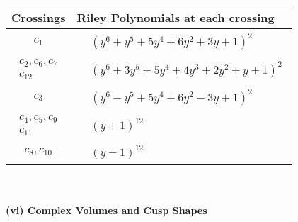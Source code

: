 \documentclass[1p]{elsarticle_modified}
\theoremstyle{definition}
\begin{document}
\begin{tabular}{m{50pt}|m{274pt}}
Crossings & \hspace{64pt}Riley Polynomials at each crossing \\
\hline $$\begin{aligned}c_{1}\end{aligned}$$&$\begin{aligned}
&(y^6+y^5+5 y^4+6 y^2+3 y+1)^2
\end{aligned}$\\
\hline $$\begin{aligned}c_{2},c_{6},c_{7}\\c_{12}\end{aligned}$$&$\begin{aligned}
&(y^6+3 y^5+5 y^4+4 y^3+2 y^2+y+1)^2
\end{aligned}$\\
\hline $$\begin{aligned}c_{3}\end{aligned}$$&$\begin{aligned}
&(y^6- y^5+5 y^4+6 y^2-3 y+1)^2
\end{aligned}$\\
\hline $$\begin{aligned}c_{4},c_{5},c_{9}\\c_{11}\end{aligned}$$&$\begin{aligned}
&(y+1)^{12}
\end{aligned}$\\
\hline $$\begin{aligned}c_{8},c_{10}\end{aligned}$$&$\begin{aligned}
&(y-1)^{12}
\end{aligned}$\\
\hline
\end{tabular}\\~\\
\newpage\flushleft \textbf{(vi) Complex Volumes and Cusp Shapes}
\end{document}
